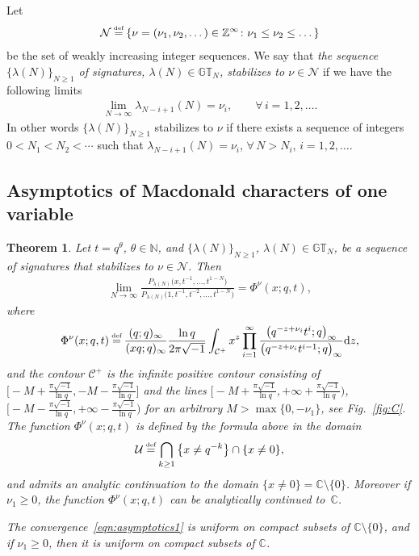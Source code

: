 \documentclass[pdftex]{sigma}
\numberwithin{equation}{section}
\newcommand\myeq{\mathrel{\stackrel{\makebox[0pt]{\mbox{\normalfont\tiny def}}}{=}}}
\newtheorem{thm}{Theorem}[section]
\newcommand{\C}{\mathbb{C}}
\newcommand{\Z}{\mathbb{Z}}
\newcommand{\N}{\mathbb{N}}
\newcommand{\CC}{\mathcal{C}}
\newcommand{\Nu}{\mathcal{N}}
\newcommand{\GT}{\mathbb{GT}}
\begin{document}
\begin{df}\label{def:stabilizing}
Let
\begin{gather*}
\Nu \myeq \{\nu = (\nu_1, \nu_2, \dots)\in\Z^{\infty}\colon \nu_1 \leq \nu_2 \leq \dots\}
\end{gather*}
be the set of weakly increasing integer sequences. We say that \textit{the sequence $\{\lambda(N)\}_{N\geq 1}$ of signatures, $\lambda(N)\in\GT_N$, stabilizes to $\nu\in\Nu$} if we have the following limits
\begin{gather*}
\lim_{N\rightarrow\infty}{\lambda_{N - i + 1}(N)} = \nu_i, \qquad \forall\, i = 1, 2, \dots.
\end{gather*}
In other words $\{\lambda(N)\}_{N\geq 1}$ stabilizes to $\nu$ if there exists a sequence of integers $0 < N_1 < N_2 < \cdots$ such that $\lambda_{N - i + 1}(N) = \nu_i$, $\forall\, N > N_i$, $i = 1, 2, \dots$.
\end{df}

\subsection{Asymptotics of Macdonald characters of one variable}

\begin{thm}\label{thm:asymptotics1}
Let $t = q^{\theta}$, $\theta\in\N$, and $\{\lambda(N)\}_{N\geq 1}$, $\lambda(N)\in\GT_N$, be a sequence of signatures that stabilizes to $\nu\in\Nu$. Then
\begin{gather}\label{eqn:asymptotics1}
\lim_{N\rightarrow\infty}{\frac{P_{\lambda(N)}\big(x, t^{-1}, \dots, t^{1 - N}\big)}{P_{\lambda(N)}\big(1, t^{-1}, t^{-2}, \dots, t^{1 - N}\big)}} = \Phi^{\nu}(x; q, t),
\end{gather}
where
\begin{gather}\label{eqn:Phi1}
\Phi^{\nu}(x; q, t) \myeq \frac{(q; q)_{\infty}}{(xq; q)_{\infty}}\frac{\ln{q}}{2\pi\sqrt{-1}}\int_{\CC^+}{x^z\prod_{i=1}^{\infty}{\frac{\big(q^{-z+\nu_i}t^i; q\big)_{\infty}}{\big(q^{-z+\nu_i}t^{i-1}; q\big)_{\infty}}}{\rm d}z},
\end{gather}
and the contour $\CC^+$ is the infinite positive contour consisting of $\big[{-}M + \frac{\pi\sqrt{-1}}{\ln{q}}, -M - \frac{\pi\sqrt{-1}}{\ln{q}}\big]$ and the lines $\big[ {-}M+\frac{\pi\sqrt{-1}}{\ln{q}}, +\infty + \frac{\pi\sqrt{-1}}{\ln{q}}\big)$, $\big[ {-}M-\frac{\pi\sqrt{-1}}{\ln{q}}, +\infty-\frac{\pi\sqrt{-1}}{\ln{q}} \big)$ for an arbitrary $M > \max\{0, -\nu_1\}$, see Fig.~{\rm \ref{fig:C}}. The function $\Phi^{\nu}(x; q, t)$ is defined by the formula above in the domain
\begin{gather*}
\mathcal{U} \myeq \bigcap_{k\geq 1}{\big\{x\neq q^{-k}\big\}}\cap{\{x \neq 0\}},
\end{gather*}
and admits an analytic continuation to the domain $\{x \neq 0\} = \C \setminus \{0\}$. Moreover if $\nu_1 \geq 0$, the function $\Phi^{\nu}(x; q, t)$ can be analytically continued to~$\C$.

The convergence~\eqref{eqn:asymptotics1} is uniform on compact subsets of $\C \setminus \{0\}$, and if $\nu_1 \geq 0$, then it is uniform on compact subsets of $\C$.
\end{thm}
\end{document}
